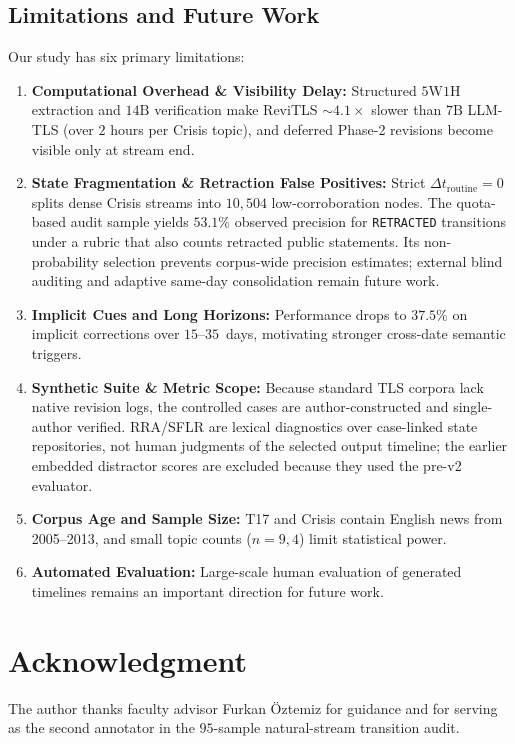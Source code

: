 \documentclass[journal]{IEEEtran}
\begin{document}
\subsection{Limitations and Future Work}
\label{subsec:limitations}

Our study has six primary limitations:
\begin{enumerate}
    \item \textbf{Computational Overhead \& Visibility Delay:} Structured $5\text{W}1\text{H}$ extraction and $14\text{B}$ verification make ReviTLS $\sim 4.1\times$ slower than $7\text{B}$ LLM-TLS (over $2$ hours per Crisis topic), and deferred Phase-2 revisions become visible only at stream end.
    \item \textbf{State Fragmentation \& Retraction False Positives:} Strict $\Delta t_{\text{routine}}=0$ splits dense Crisis streams into $10{,}504$ low-corroboration nodes. The quota-based audit sample yields $53.1\%$ observed precision for \texttt{RETRACTED} transitions under a rubric that also counts retracted public statements. Its non-probability selection prevents corpus-wide precision estimates; external blind auditing and adaptive same-day consolidation remain future work.
    \item \textbf{Implicit Cues and Long Horizons:} Performance drops to $37.5\%$ on implicit corrections over $15\text{--}35$~days, motivating stronger cross-date semantic triggers.
    \item \textbf{Synthetic Suite \& Metric Scope:} Because standard TLS corpora lack native revision logs, the controlled cases are author-constructed and single-author verified. RRA/SFLR are lexical diagnostics over case-linked state repositories, not human judgments of the selected output timeline; the earlier embedded distractor scores are excluded because they used the pre-v2 evaluator.
    \item \textbf{Corpus Age and Sample Size:} T17 and Crisis contain English news from 2005--2013, and small topic counts ($n=9, 4$) limit statistical power.
    \item \textbf{Automated Evaluation:} Large-scale human evaluation of generated timelines remains an important direction for future work.
\end{enumerate}

\section*{Acknowledgment}
The author thanks faculty advisor Furkan \"{O}ztemiz for guidance and for serving as the second annotator in the $95$-sample natural-stream transition audit.
\end{document}
